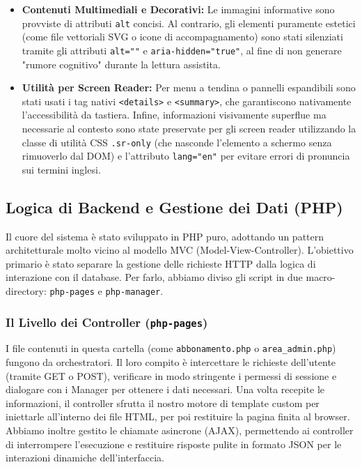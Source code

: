 \documentclass[11pt,a4paper]{article}
\begin{document}
\begin{itemize}
    \item \textbf{Contenuti Multimediali e Decorativi:} Le immagini informative sono provviste di attributi \texttt{alt} concisi. Al contrario, gli elementi puramente estetici (come file vettoriali SVG o icone di accompagnamento) sono stati silenziati tramite gli attributi \texttt{alt=""} e \texttt{aria-hidden="true"}, al fine di non generare "rumore cognitivo" durante la lettura assistita.

    \item \textbf{Utilità per Screen Reader:} Per menu a tendina o pannelli espandibili sono stati usati i tag nativi \texttt{<details>} e \texttt{<summary>}, che garantiscono nativamente l'accessibilità da tastiera. Infine, informazioni visivamente superflue ma necessarie al contesto sono state preservate per gli screen reader utilizzando la classe di utilità CSS \texttt{.sr-only} (che nasconde l'elemento a schermo senza rimuoverlo dal DOM) e l'attributo \texttt{lang="en"} per evitare errori di pronuncia sui termini inglesi.
\end{itemize}

\subsection{Logica di Backend e Gestione dei Dati (PHP)}

Il cuore del sistema è stato sviluppato in PHP puro, adottando un pattern architetturale molto vicino al modello MVC (Model-View-Controller). L'obiettivo primario è stato separare la gestione delle richieste HTTP dalla logica di interazione con il database. Per farlo, abbiamo diviso gli script in due macro-directory: \texttt{php-pages} e \texttt{php-manager}.

\subsubsection{Il Livello dei Controller (\texttt{php-pages})}
I file contenuti in questa cartella (come \texttt{abbonamento.php} o \texttt{area\_admin.php}) fungono da orchestratori. Il loro compito è intercettare le richieste dell'utente (tramite GET o POST), verificare in modo stringente i permessi di sessione e dialogare con i Manager per ottenere i dati necessari. Una volta recepite le informazioni, il controller sfrutta il nostro motore di template custom per iniettarle all'interno dei file HTML, per poi restituire la pagina finita al browser. Abbiamo inoltre gestito le chiamate asincrone (AJAX), permettendo ai controller di interrompere l'esecuzione e restituire risposte pulite in formato JSON per le interazioni dinamiche dell'interfaccia.
\end{document}
